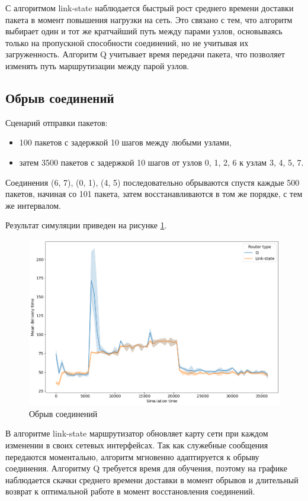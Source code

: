 \documentclass[a4paper]{article}
\begin{document}
С алгоритмом link-state наблюдается быстрый рост среднего времени доставки
пакета в момент повышения нагрузки на сеть. Это связано с тем, что алгоритм
выбирает один и тот же кратчайший путь между парами узлов, основываясь только на
пропускной способности соединений, но не учитывая их
загруженность. Алгоритм Q учитывает время передачи пакета, что позволяет
изменять путь маршрутизации между парой узлов.

\subsection{Обрыв соединений}

Сценарий отправки пакетов:

\begin{itemize}
    \item 100 пакетов с задержкой 10 шагов между любыми узлами,

    \item затем 3500 пакетов с задержкой 10 шагов от узлов 0, 1, 2, 6 к узлам 3, 4,
        5, 7.
\end{itemize}

Соединения (6, 7), (0, 1), (4, 5) последовательно обрываются спустя каждые 500
пакетов, начиная со 101 пакета, затем восстанавливаются в том же порядке, с тем
же интервалом.

Результат симуляции приведен на рисунке \ref{fig:link}.

\begin{figure}[H]
    \centering
    \includegraphics[width=\textwidth]{figs/link-break}
    \caption{Обрыв соединений}\label{fig:link}
\end{figure}

В алгоритме link-state маршрутизатор обновляет карту сети при каждом изменении
в своих сетевых интерфейсах. Так как служебные сообщения передаются моментально,
алгоритм мгновенно адаптируется к обрыву соединения. Алгоритму Q требуется
время для обучения, поэтому на графике наблюдается скачки среднего времени
доставки в момент обрывов и длительный возврат к оптимальной работе в момент
восстановления соединений.
\end{document}
